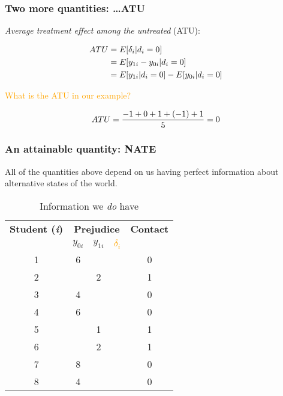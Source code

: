 \documentclass[12pt,english,dvipsnames,aspectratio=169,handout]{beamer}\usepackage[]{graphicx}\usepackage[]{xcolor}
\begin{document}
\begin{frame}
  \frametitle{Two more quantities: \dots ATU}
  
  \textit{Average treatment effect among the untreated} (ATU):
  
  \begin{align}
  \footnotesize
    ATU &= E[\delta_i|d_i=0] \nonumber \\
        &= E[y_{1i} - y_{0i}|d_i=0] \\
        &= E[y_{1i}|d_i=0] - E[y_{0i}|d_i=0] \nonumber 
  \label{eq:08}
  \end{align}
  
  \textcolor{orange}{What is the ATU in our example?}
  \pause
  
  \begin{equation}
  \footnotesize
  ATU = \frac{-1+0+1+(-1)+1}{5} = 0
    \label{eq:09}
  \end{equation}
  
\end{frame}


\begin{frame}
  \frametitle{An attainable quantity: NATE}
  
  All of the quantities above depend on us having perfect information about alternative states of the world.\bigskip
  
  \begin{table}[!ht]
  \centering
  \scriptsize
  \begin{tabular}{c c c c c}
  \toprule
  \textbf{Student (\textit{i})} & \multicolumn{3}{c}{\textbf{Prejudice}} & \textbf{Contact} \\
  & $y_{0i}$ & $y_{1i}$ & \textcolor{orange}{$\delta_i$} &  \\
  \midrule
  1 & 6 &   &  & 0 \\
  2 &   & 2 &  & 1 \\
  3 & 4 &   &  & 0\\
  4 & 6 &   &  & 0\\
  5 &   & 1 &  & 1 \\
  6 &   & 2 &  & 1\\
  7 & 8 &   &  & 0 \\
  8 & 4 &   &  & 0\\
  \bottomrule
  \end{tabular}
  \label{tab:05}
  \caption{Information we \textit{do} have}
  \end{table}
  
  
\end{frame}
\end{document}
